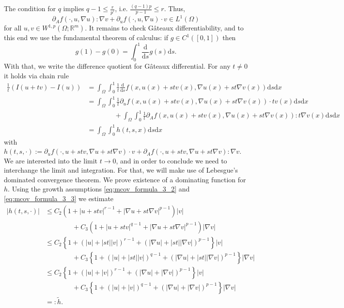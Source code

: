 The condition for $q$ implies $q-1\leq\frac{r}{p'}$, i.e. $\frac{(q-1)p}{p-1}\leq r$. Thus,
\[\partial_Af(\cdot,u,\nabla u):\nabla v+\partial_uf(\cdot,u,\nabla u)\cdot v\in L^1(\Omega)\]
for all $u,v\in W^{1,p}(\Omega;\mathbb{R}^m)$. It remains to check G\^ateaux differentiability, and to this end we use the fundamental theorem of calculus: if $g\in C^1([0,1])$ then
\[g(1)-g(0)=\int_0^1{\frac{\mathrm{d}}{\mathrm{d}s}g(s)\mathrm{d}s}.\]
With that, we write the difference quotient for G\^ateaux differential. For any $t\ne0$ it holds via chain rule
\begin{align*}
	\frac{1}{t}(I(u+tv)-I(u))&=\int_\Omega{\int_0^1{\frac{1}{t}\frac{\mathrm{d}}{\mathrm{d}s}f(x,u(x)+stv(x),\nabla u(x)+st\nabla v(x))\mathrm{d}s}\mathrm{d}x}\\
	&=\int_\Omega{\int_0^1{\frac{1}{t}\partial_uf(x,u(x)+stv(x),\nabla u(x)+st\nabla v(x))\cdot tv(x)\mathrm{d}s}\mathrm{d}x}\\
	&\qquad\qquad+\int_\Omega{\int_0^1{\frac{1}{t}\partial_Af(x,u(x)+stv(x),\nabla u(x)+st\nabla v(x)):t\nabla v(x)\mathrm{d}s}\mathrm{d}x}\\
	&=\int_\Omega{\int_0^1{h(t,s,x)\mathrm{d}s}\mathrm{d}x}
\end{align*}
with $h(t,s,\cdot):=\partial_uf(\cdot,u+stv,\nabla u+st\nabla v)\cdot v+\partial_Af(\cdot,u+stv,\nabla u+st\nabla v):\nabla v$. We are interested into the limit $t\to0$, and in order to conclude we need to interchange the limit and integration. For that, we will make use of Lebesgue's dominated convergence theorem. We prove existence of a dominating function for $h$. Using the growth assumptions \eqref{eq:mcov_formula_3_2} and \eqref{eq:mcov_formula_3_3} we estimate
\begin{align*}
	\lvert h(t,s,\cdot)\rvert&\leq C_2(1+\lvert u+stv\rvert^{r-1}+\lvert\nabla u+st\nabla v\rvert^{p-1})\lvert v\rvert\\
	&\qquad\qquad+C_3(1+\lvert u+stv\rvert^{q-1}+\lvert\nabla u+st\nabla v\rvert^{p-1})\lvert\nabla v\rvert\\
	&\leq C_2\left\{1+\left(\lvert u\rvert+\lvert st\rvert\lvert v\rvert\right)^{r-1}+\left(\lvert\nabla u\rvert+\lvert st\rvert\lvert\nabla v\rvert\right)^{p-1}\right\}\lvert v\rvert\\
	&\qquad\qquad+C_3\left\{1+\left(\lvert u\rvert+\lvert st\rvert\lvert v\rvert\right)^{q-1}+\left(\lvert\nabla u\rvert+\lvert st\rvert\lvert\nabla v\rvert\right)^{p-1}\right\}\lvert\nabla v\rvert\\
	&\leq C_2\left\{1+\left(\lvert u\rvert+\lvert v\rvert\right)^{r-1}+\left(\lvert\nabla u\rvert+\lvert\nabla v\rvert\right)^{p-1}\right\}\lvert v\rvert\\
	&\qquad\qquad+C_3\left\{1+\left(\lvert u\rvert+\lvert v\rvert\right)^{q-1}+\left(\lvert\nabla u\rvert+\lvert\nabla v\rvert\right)^{p-1}\right\}\lvert\nabla v\rvert\\
	&=:\tilde{h}.
\end{align*}
